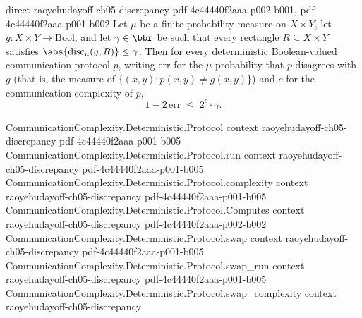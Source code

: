 \begin{theorem}
  {direct}
  {raoyehudayoff-ch05-discrepancy}
  {pdf-4c44440f2aaa-p002-b001,
    pdf-4c44440f2aaa-p001-b002}
Let $\mu$ be a finite probability measure on $X \times Y$, let $g : X \times Y \to
\mathrm{Bool}$, and let $\gamma \in \bbr$ be such that every rectangle $R \subseteq X
\times Y$ satisfies $\abs{\mathrm{disc}_\mu(g, R)} \le \gamma$. Then for every
deterministic Boolean-valued communication protocol $p$, writing $\mathrm{err}$ for the
$\mu$-probability that $p$ disagrees with $g$ (that is, the measure of $\{(x,y) : p(x,y)
\ne g(x,y)\}$) and $c$ for the communication complexity of $p$,
\[
  1 - 2\,\mathrm{err} \;\le\; 2^{c}\cdot\gamma .
\]
\end{theorem}

\begin{theorem}
\label{CommunicationComplexity.Deterministic.Protocol.logb_le_complexity_of_distributionalError}
\leanok
{}
\proofstep
  {CommunicationComplexity.Deterministic.Protocol}
  {context}
  {raoyehudayoff-ch05-discrepancy}
  {pdf-4c44440f2aaa-p001-b005}
\proofstep
  {CommunicationComplexity.Deterministic.Protocol.run}
  {context}
  {raoyehudayoff-ch05-discrepancy}
  {pdf-4c44440f2aaa-p001-b005}
\proofstep
  {CommunicationComplexity.Deterministic.Protocol.complexity}
  {context}
  {raoyehudayoff-ch05-discrepancy}
  {pdf-4c44440f2aaa-p001-b005}
\proofstep
  {CommunicationComplexity.Deterministic.Protocol.Computes}
  {context}
  {raoyehudayoff-ch05-discrepancy}
  {pdf-4c44440f2aaa-p002-b002}
\proofstep
  {CommunicationComplexity.Deterministic.Protocol.swap}
  {context}
  {raoyehudayoff-ch05-discrepancy}
  {pdf-4c44440f2aaa-p001-b005}
\proofstep
  {CommunicationComplexity.Deterministic.Protocol.swap_run}
  {context}
  {raoyehudayoff-ch05-discrepancy}
  {pdf-4c44440f2aaa-p001-b005}
\proofstep
  {CommunicationComplexity.Deterministic.Protocol.swap_complexity}
  {context}
  {raoyehudayoff-ch05-discrepancy}

\end{theorem}
